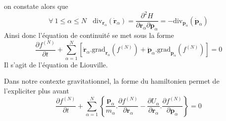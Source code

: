 on constate alors que
\[
\forall~1\leq\alpha\leq N~~~~\mathrm{div}_{\mathbf{r}_{\alpha}}\left(
\mathbf{\dot{r}}_{\alpha}\right)  =\frac{\partial^{2}H}{\partial
\mathbf{r}_{\alpha}\partial\mathbf{p}_{\alpha}}=-\mathrm{div}_{\mathbf{p}%
_{\alpha}}\left(  \mathbf{\dot{p}}_{\alpha}\right)
\]
Ainsi donc l'\'{e}quation de continuit\'{e} se met sous la forme
\begin{equation}
\frac{\partial f^{(N)}}{\partial t}+\sum_{\alpha=1}^{N}\left[  \mathbf{\dot
{r}}_{\alpha}.\mathrm{grad}_{\mathbf{r}_{\alpha}}\left(  f^{(N)}\right)
+\mathbf{\dot{p}}_{\alpha}.\mathrm{grad}_{\mathbf{p}_{\alpha}}\left(
f^{(N)}\right)  \right]  =0\label{liouville}%
\end{equation}
Il s'agit de l'\'{e}quation de {Liouville}.

Dans notre contexte gravitationnel, la forme du hamiltonien permet de
l'expli\-ci\-ter plus avant
\[
\frac{\partial f^{(N)}}{\partial t}+\sum_{\alpha=1}^{N}\left\{  \dfrac
{\mathbf{p}_{\alpha}}{m_{\alpha}}.\dfrac{\partial f^{(N)}}{\partial
\mathbf{r}_{\alpha}}-\dfrac{\partial U_{\alpha}}{\partial\mathbf{r}_{\alpha}%
}.\dfrac{\partial f^{(N)}}{\partial\mathbf{p}_{\alpha}}\right\}  =0
\]



